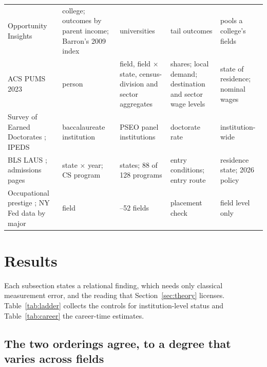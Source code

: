 \documentclass[11pt]{article}
\begin{document}
\begin{table}[!tbp]
\begin{tabular}{@{}>{\raggedright\arraybackslash}p{3.0cm}>{\raggedright\arraybackslash}p{3.6cm}>{\raggedright\arraybackslash}p{3.3cm}>{\raggedright\arraybackslash}p{1.9cm}>{\raggedright\arraybackslash}p{3.8cm}@{}}
Opportunity Insights \citep{chetty2020income} & college; outcomes by parent income; Barron's 2009 index & 242 universities & tail outcomes & pools a college's fields \\
ACS PUMS 2023 \citep{census_acs2023_pums} & person & field, field $\times$ state, census-division and sector aggregates & shares; local demand; destination and sector wage levels & state of residence; nominal wages \\
Survey of Earned Doctorates \citep{ncses_sed_bacc}; IPEDS \citep{nces_ipeds} & baccalaureate institution & PSEO panel institutions & doctorate rate & institution-wide \\
BLS LAUS \citep{fred_laus}; admissions pages & state $\times$ year; CS program & 18 states; 88 of 128 programs & entry conditions; entry route & residence state; 2026 policy \\
Occupational prestige \citep{hughes2024occupational}; NY Fed data by major \citep{nyfed2026labor} & field & 32--52 fields & placement check & field level only \\
\bottomrule
\end{tabular}
\end{table}

\section{Results}\label{sec:results}

Each subsection states a relational finding, which needs only classical measurement error, and the reading that
Section~\ref{sec:theory} licenses. Table~\ref{tab:ladder} collects the controls for
institution-level status and Table~\ref{tab:career} the career-time estimates.

\subsection{The two orderings agree, to a degree that varies across fields}\label{sec:map}
\end{document}
